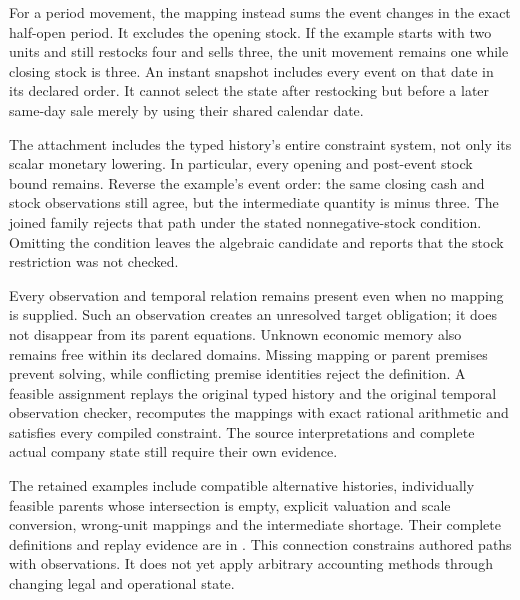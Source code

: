 For a period movement, the mapping instead sums the event changes in the exact
half-open period. It excludes the opening stock. If the example starts with
two units and still restocks four and sells three, the unit movement remains
one while closing stock is three. An instant snapshot includes every event
on that date in its declared order. It cannot select the state after restocking
but before a later same-day sale merely by using their shared calendar date.

The attachment includes the typed history's entire constraint system, not only
its scalar monetary lowering. In particular, every opening and post-event
stock bound remains. Reverse the example's event order: the same closing cash
and stock observations still agree, but the intermediate quantity is minus
three. The joined family rejects that path under the stated nonnegative-stock
condition. Omitting the condition leaves the algebraic candidate and reports
that the stock restriction was not checked.

Every observation and temporal relation remains present even when no mapping
is supplied. Such an observation creates an unresolved target obligation;
it does not disappear from its parent equations. Unknown economic memory also
remains free within its declared domains. Missing mapping or parent premises
prevent solving, while conflicting premise identities reject the definition.
A feasible assignment replays the original typed history and the original
temporal observation checker, recomputes the mappings with exact rational
arithmetic and satisfies every compiled constraint. The source interpretations
and complete actual company state still require their own evidence.

The retained examples include compatible alternative histories, individually
feasible parents whose intersection is empty, explicit valuation and scale
conversion, wrong-unit mappings and the intermediate shortage. Their complete
definitions and replay evidence are in
.
This connection constrains authored paths with observations. It does not yet
apply arbitrary accounting methods through changing legal and operational state.
